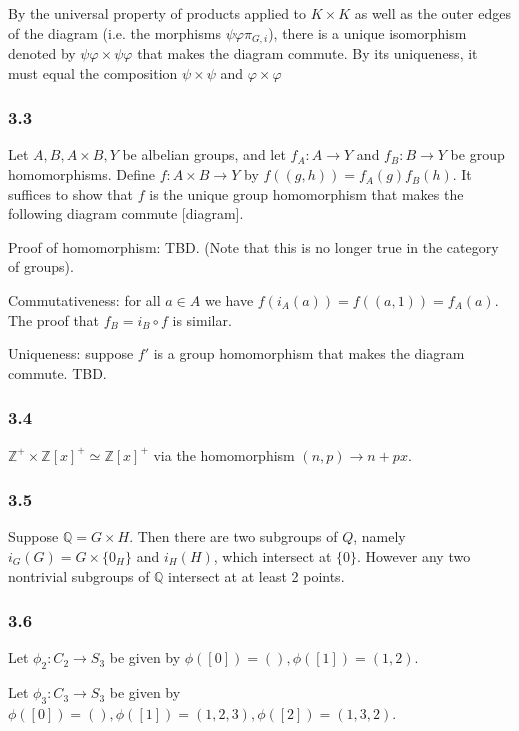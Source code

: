 \documentclass{article}
\def\Q{\mathbb{Q}}
\def\Z{\mathbb{Z}}
\begin{document}
By the universal property of products applied to $K \times K$ as well as the outer edges of the diagram (i.e. the morphisms $\psi \varphi \pi_{G, i}$), there is a  unique isomorphism denoted by $\psi\varphi \times \psi\varphi$ that makes the diagram commute. By its uniqueness, it must equal the composition $\psi \times \psi$ and $\varphi \times \varphi$

\subsubsection*{3.3}

Let $A, B, A \times B, Y$ be albelian groups, and let $f_A : A \to Y$ and $f_B: B \to Y$ be group homomorphisms. Define $f: A \times B \to Y$ by $f((g, h)) = f_A(g) f_B(h)$. It suffices to show that $f$ is the unique group homomorphism that makes the following diagram commute [diagram].

Proof of homomorphism: TBD. (Note that this is no longer true in the category of groups).

Commutativeness: for all $a \in A$ we have $f(i_A(a)) = f((a, 1)) = f_A(a)$. The proof that $f_B = i_B \circ f$ is similar.

Uniqueness: suppose $f'$ is a group homomorphism that makes the diagram commute. TBD.

\subsubsection*{3.4}

$\Z^+ \times \Z[x]^+\simeq \Z[x]^+$ via the homomorphism $(n, p) \to n + px$.

\subsubsection*{3.5}

Suppose $\Q = G \times H$. Then there are two subgroups of $Q$, namely $i_G(G) = G \times \{0_H\}$ and $i_H(H)$, which intersect at $\{0\}$. However any two nontrivial subgroups of $\Q$ intersect at at least 2 points.

\subsubsection*{3.6}

Let $\phi_2: C_2 \to S_3$ be given by $\phi([0]) = (), \phi([1]) = (1, 2)$.

Let $\phi_3: C_3 \to S_3$ be given by $\phi([0]) = (), \phi([1]) = (1, 2, 3), \phi([2]) = (1, 3, 2)$.
\end{document}
